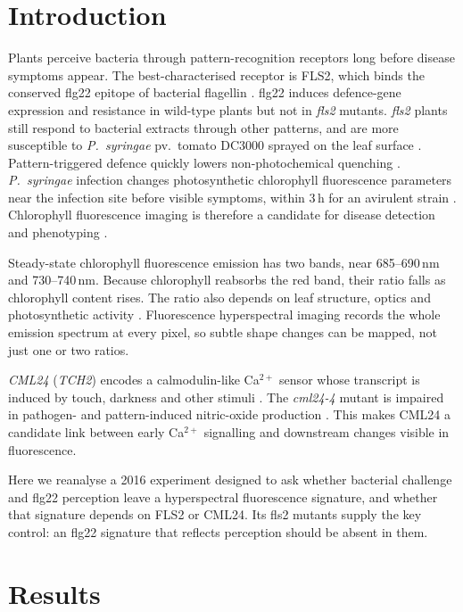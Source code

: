 \documentclass[11pt,a4paper]{article}
\begin{document}
\section{Introduction}
Plants perceive bacteria through pattern-recognition receptors long before disease
symptoms appear. The best-characterised receptor is FLS2, which binds the conserved flg22
epitope of bacterial flagellin \citep{felix1999,gomezgomez1999,gomezgomez2000,chinchilla2006}.
flg22 induces defence-gene expression and resistance in wild-type plants but not in
\textit{fls2} mutants. \textit{fls2} plants still respond to bacterial extracts through other
patterns, and are more susceptible to \textit{P.~syringae} pv.\ tomato DC3000 sprayed on the
leaf surface \citep{zipfel2004}. Pattern-triggered defence quickly lowers non-photochemical
quenching \citep{gohre2012}. \textit{P.~syringae} infection changes photosynthetic chlorophyll
fluorescence parameters near the infection site before visible symptoms, within 3\,h for an
avirulent strain \citep{bonfig2006}. Chlorophyll fluorescence imaging is therefore a
candidate for disease detection and phenotyping
\citep{rousseau2013,perezbueno2016,perezbueno2019,mahlein2016}.

Steady-state chlorophyll fluorescence emission has two bands, near 685--690\,nm and
730--740\,nm. Because chlorophyll reabsorbs the red band, their ratio falls as chlorophyll
content rises. The ratio also depends on leaf structure, optics and photosynthetic activity
\citep{buschmann2007}. Fluorescence hyperspectral imaging records the whole emission spectrum
at every pixel, so subtle shape changes can be mapped, not just one or two ratios.

\textit{CML24} (\textit{TCH2}) encodes a calmodulin-like Ca$^{2+}$ sensor whose transcript is
induced by touch, darkness and other stimuli \citep{delk2005}. The \textit{cml24-4} mutant is
impaired in pathogen- and pattern-induced nitric-oxide production \citep{ma2008}. This makes
CML24 a candidate link between early Ca$^{2+}$ signalling and downstream changes visible in
fluorescence.

Here we reanalyse a 2016 experiment designed to ask whether bacterial challenge and flg22
perception leave a hyperspectral fluorescence signature, and whether that signature
depends on FLS2 or CML24. Its fls2 mutants supply the key control: an flg22 signature that
reflects perception should be absent in them.

\section{Results}
\end{document}
